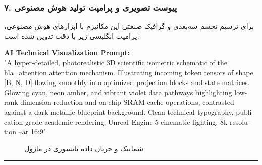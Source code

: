 \subsubsection*{۷. پیوست تصویری و پرامپت تولید هوش مصنوعی}
برای ترسیم تجسم سه‌بعدی و گرافیک صنعتی این مکانیزم با ابزارهای هوش مصنوعی، پرامپت انگلیسی زیر با دقت تدوین شده است:

\vspace{0.2cm}
\begin{latin}
\footnotesize
\textbf{AI Technical Visualization Prompt:}\\
"A hyper-detailed, photorealistic 3D scientific isometric schematic of the hla\_attention attention mechanism. Illustrating incoming token tensors of shape [B, N, D] flowing smoothly into optimized projection blocks and state matrices. Glowing cyan, neon amber, and vibrant violet data pathways highlighting low-rank dimension reduction and on-chip SRAM cache operations, contrasted against a dark metallic blueprint background. Clean technical typography, publication-grade academic rendering, Unreal Engine 5 cinematic lighting, 8k resolution --ar 16:9"
\end{latin}

\begin{figure}[H]
    \centering
    \caption{شماتیک و جریان داده تانسوری در ماژول }
    \label{fig:hla_attention}
\end{figure}

\vspace{0.5cm}
\hrule
\vspace{0.5cm}
